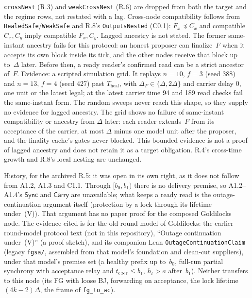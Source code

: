 \documentclass{article}
\begin{document}
\texttt{crossNest}
(R.3) and \texttt{weakCrossNest} (R.6) are dropped from both the target and
the regime rows, not restated with a lag.  Cross-node compatibility follows
from \texttt{HealedSafe}/\texttt{WeakSafe} and R.8's \texttt{OutputsNested}
(C0.1): $F_x\preceq C_x$ and compatible $C_x,C_y$ imply compatible $F_x,C_y$.
Lagged ancestry is not stated.  The former same-instant ancestry fails for
this protocol: an honest proposer can finalize~$F$ when it accepts its
own block inside its tick, and the other nodes receive that block up
to~$\Delta$ later.  Before then, a ready reader's confirmed read can be a
strict ancestor of~$F$.  Evidence: a scripted simulation grid.  It
replays $n=10$, $f=3$ (seed 388) and $n=13$, $f=4$ (seed 427) past
$T_{\mathrm{heal}}$, with $\Delta_F\in\{\Delta,2\Delta\}$ and carrier delay
$0$, one unit or the latest legal; at the latest carrier time 94 and 189 read
checks fail the same-instant form.  The random sweeps never reach this shape,
so they supply no evidence for lagged ancestry.  The grid shows no failure
of same-instant compatibility or ancestry from $\Delta$ later: each reader
extends~$F$ from its acceptance of the carrier, at most $\Delta$ minus one
model unit after the proposer, and the finality cache's gates never blocked.
This bounded evidence is not a proof of lagged ancestry and does not retain
it as a target obligation.  R.4's cross-time growth and R.8's local nesting
are unchanged.

History, for the archived R.5: it was open in its own right, as it does not follow from A1.2, A1.3 and C1.1.
Through $[b_0,b_1)$ there is no delivery premise, so A1.2--A1.4's
$\mathsf{Sync}$ and $\mathsf{Carry}$ are unavailable; what keeps a ready read
is the outage-continuation argument itself (protection by a lock through its
lifetime under~(V)).  That argument has no paper proof for the composed
Goldilocks node.  The evidence cited is for the old round model of Goldilocks:
the earlier round-model protocol text (not in this repository), ``Outage
continuation under~(V)'' (a proof sketch), and its
companion Lean \texttt{OutageContinuationClaim} (legacy \texttt{fgsa/}, assembled
from that model's foundation and clean-cut suppliers), under that model's
premise set (a healthy prefix up to~$b_0$, full-run partial synchrony with
acceptance relay and $t_{\mathrm{GST}}\leq b_1$, $h_t>a$ after~$b_1$).  Neither
transfers to this node (its FG with loose BJ, forwarding on acceptance, the
lock lifetime $(4k-2)\Delta$, the frame of \texttt{fg\_to\_ac}).
\end{document}
